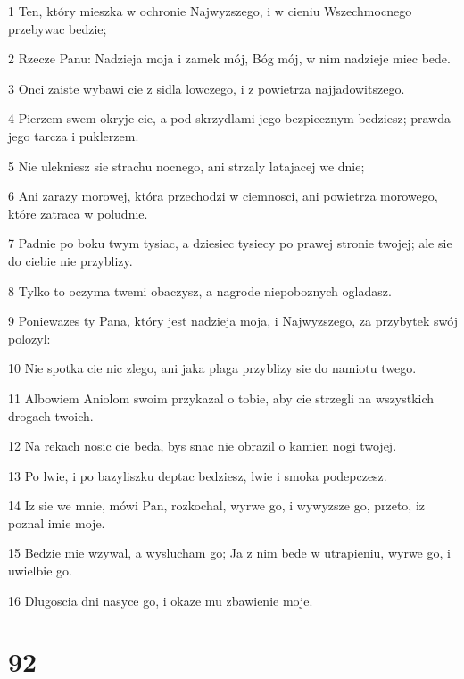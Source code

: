 \par 1 Ten, który mieszka w ochronie Najwyzszego, i w cieniu Wszechmocnego przebywac bedzie;
\par 2 Rzecze Panu: Nadzieja moja i zamek mój, Bóg mój, w nim nadzieje miec bede.
\par 3 Onci zaiste wybawi cie z sidla lowczego, i z powietrza najjadowitszego.
\par 4 Pierzem swem okryje cie, a pod skrzydlami jego bezpiecznym bedziesz; prawda jego tarcza i puklerzem.
\par 5 Nie ulekniesz sie strachu nocnego, ani strzaly latajacej we dnie;
\par 6 Ani zarazy morowej, która przechodzi w ciemnosci, ani powietrza morowego, które zatraca w poludnie.
\par 7 Padnie po boku twym tysiac, a dziesiec tysiecy po prawej stronie twojej; ale sie do ciebie nie przyblizy.
\par 8 Tylko to oczyma twemi obaczysz, a nagrode niepoboznych ogladasz.
\par 9 Poniewazes ty Pana, który jest nadzieja moja, i Najwyzszego, za przybytek swój polozyl:
\par 10 Nie spotka cie nic zlego, ani jaka plaga przyblizy sie do namiotu twego.
\par 11 Albowiem Aniolom swoim przykazal o tobie, aby cie strzegli na wszystkich drogach twoich.
\par 12 Na rekach nosic cie beda, bys snac nie obrazil o kamien nogi twojej.
\par 13 Po lwie, i po bazyliszku deptac bedziesz, lwie i smoka podepczesz.
\par 14 Iz sie we mnie, mówi Pan, rozkochal, wyrwe go, i wywyzsze go, przeto, iz poznal imie moje.
\par 15 Bedzie mie wzywal, a wyslucham go; Ja z nim bede w utrapieniu, wyrwe go, i uwielbie go.
\par 16 Dlugoscia dni nasyce go, i okaze mu zbawienie moje.

\chapter{92}

